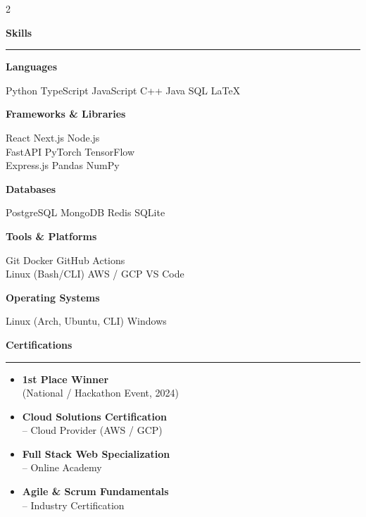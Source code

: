 \documentclass[10pt, a4paper]{article}
\newcommand{\skilllabel}[1]{%
  {\small\bfseries\color{accentlight} #1}\par\vspace{1pt}%
}
\newcommand{\skillval}[1]{%
  {\footnotesize\color{mwhite} #1}\par\vspace{5pt}%
}
\newcommand{\leftsection}[1]{%
  \vspace{8pt}%
  {\color{accent}\large\bfseries #1}\\[-2pt]%
  {\color{accent}\rule{\linewidth}{1pt}}\par\vspace{4pt}%
}
\begin{document}
\begin{paracol}{2}
\begin{leftcolumn}
\begin{minipage}[t]{\dimexpr\linewidth-16pt}
  \vspace{10pt}

  \leftsection{Skills}

  \skilllabel{Languages}
  \skillval{Python \textbullet{} TypeScript \textbullet{} JavaScript \textbullet{} C++ \textbullet{} Java \textbullet{} SQL \textbullet{} LaTeX}
  \vspace{2pt}
  \skilllabel{Frameworks \& Libraries}
  \skillval{React \textbullet{} Next.js \textbullet{} Node.js \textbullet{} \\FastAPI \textbullet{} PyTorch \textbullet{} TensorFlow \textbullet{} \\Express.js \textbullet{} Pandas \textbullet{} NumPy}
  \vspace{2pt}
  \skilllabel{Databases}
  \skillval{PostgreSQL \textbullet{} MongoDB \textbullet{} Redis \textbullet{} SQLite}
  \vspace{2pt}
  \skilllabel{Tools \& Platforms}
  \skillval{Git \textbullet{} Docker \textbullet{} GitHub Actions \textbullet{} \\Linux (Bash/CLI) \textbullet{} AWS / GCP \textbullet{} VS Code}
  \vspace{2pt}
  \skilllabel{Operating Systems}
  \skillval{Linux (Arch, Ubuntu, CLI) \textbullet{} Windows}

  \vspace{8pt}

  \leftsection{Certifications}

  {\footnotesize\color{mwhite}
  \begin{itemize}[leftmargin=1.1em, itemsep=4pt, topsep=2pt, parsep=0pt]
    \item[\color{accent}\textbullet] \textbf{1st Place Winner}\\(National / Hackathon Event, 2024)
    \item[\color{accent}\textbullet] \textbf{Cloud Solutions Certification}\\-- Cloud Provider (AWS / GCP)
    \item[\color{accent}\textbullet] \textbf{Full Stack Web Specialization}\\-- Online Academy
    \item[\color{accent}\textbullet] \textbf{Agile \& Scrum Fundamentals}\\-- Industry Certification
  \end{itemize}
  }

\end{minipage}
\end{leftcolumn}


\end{paracol}
\end{document}

